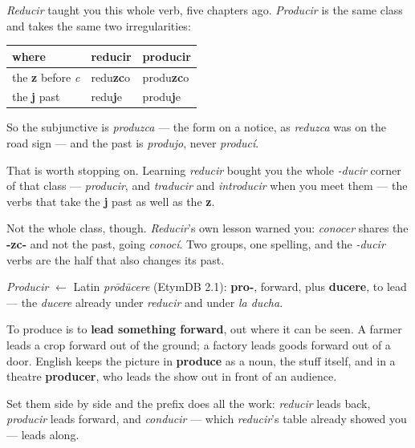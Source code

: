 \begin{grammarlens}[title={Grammar Lens: nothing new here, which is the point}]
\emph{Reducir} taught you this whole verb, five chapters ago. \emph{Producir} is the same class and takes the same two irregularities:

\noindent
\begin{tabularx}{\linewidth}{@{}>{\raggedright\arraybackslash}X>{\raggedright\arraybackslash}X>{\raggedright\arraybackslash}X@{}}
\toprule
\textbf{where} & \textbf{reducir} & \textbf{producir} \\
\midrule
the \textbf{z} before \emph{c} & redu\textbf{zc}o & produ\textbf{zc}o \\
the \textbf{j} past & redu\textbf{j}e & produ\textbf{j}e \\
\bottomrule
\end{tabularx}

So the subjunctive is \emph{produzca} — the form on a notice, as \emph{reduzca} was on the road sign — and the past is \emph{produjo}, never \emph{producí}.

That is worth stopping on. Learning \emph{reducir} bought you the whole \emph{-ducir} corner of that class — \emph{producir}, and \emph{traducir} and \emph{introducir} when you meet them — the verbs that take the \textbf{j} past as well as the \textbf{z}.

Not the whole class, though. \emph{Reducir}'s own lesson warned you: \emph{conocer} shares the \textbf{-zc-} and not the past, going \emph{conocí}. Two groups, one spelling, and the \emph{-ducir} verbs are the half that also changes its past.
\end{grammarlens}

\begin{cousinweb}
\emph{Producir} $\leftarrow$ Latin \emph{prōdūcere} (EtymDB 2.1): \textbf{pro-}, forward, plus \textbf{ducere}, to lead — the \emph{ducere} already under \emph{reducir} and under \emph{la ducha}.

To produce is to \textbf{lead something forward}, out where it can be seen. A farmer leads a crop forward out of the ground; a factory leads goods forward out of a door. English keeps the picture in \textbf{produce} as a noun, the stuff itself, and in a theatre \textbf{producer}, who leads the show out in front of an audience.

Set them side by side and the prefix does all the work: \emph{reducir} leads back, \emph{producir} leads forward, and \emph{conducir} — which \emph{reducir}'s table already showed you — leads along.
\end{cousinweb}

